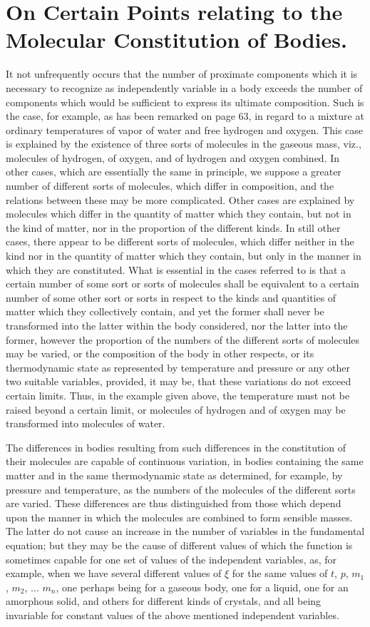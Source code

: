 \documentclass[12pt]{article}
\begin{document}
\section{On Certain Points relating to the Molecular Constitution of Bodies.}
It not unfrequently occurs that the number of proximate components which it is necessary to recognize as independently variable in a body exceeds the number of components which would be sufficient to express its ultimate composition. Such is the case, for example, as has been remarked on page 63, in regard to a mixture at ordinary temperatures of vapor of water and free hydrogen and oxygen. This case is explained by the existence of three sorts of molecules in the gaseous mass, viz., molecules of hydrogen, of oxygen, and of hydrogen and oxygen combined. In other cases, which are essentially the same in principle, we suppose a greater number of different sorts of molecules, which differ in composition, and the relations between these may be more complicated. 
Other cases are explained by molecules which differ in the quantity of matter which they contain, but not in the kind of matter, nor in the proportion of the different kinds. 
In still other cases, there appear to be different sorts of molecules, which differ neither in the kind nor in the quantity of matter which they contain, but only in the manner in which they are constituted. What is essential in the cases referred to is that a certain number of some sort or sorts of molecules shall be equivalent to a certain number of some other sort or sorts in respect to the kinds and quantities of matter which they collectively contain, and yet the former shall never be transformed into the latter within the body considered, nor the latter into the former, however the proportion of the numbers of the different sorts of molecules may be varied, or the composition of the body in other respects, or its thermodynamic state as represented by temperature and pressure or any other two suitable variables, provided, it may be, that these variations do not exceed certain limits. Thus, in the
example given above, the temperature must not be raised beyond a certain limit, or molecules of hydrogen and of oxygen may be transformed into molecules of water.


The differences in bodies resulting from such differences in the constitution of their molecules are capable of continuous variation, in bodies containing the same matter and in the same thermodynamic state as determined, for example, by pressure and temperature, as the numbers of the molecules of the different sorts are varied. These differences are thus distinguished from those which depend upon the manner in which the molecules are combined to form sensible masses. The latter do not cause an increase in the number of variables in the fundamental equation; but they may be the cause of different values of which the function is sometimes capable for one set of values of the independent variables, as, for example, when we have several different values of $\xi$ for the same values of $t$, $p$, $m_1$, $m_2$, ... $m_n$, one perhaps being for a gaseous body, one for a liquid, one for an amorphous solid, and others for different kinds of crystals, and all being invariable for constant values of the above mentioned independent variables.
\end{document}
